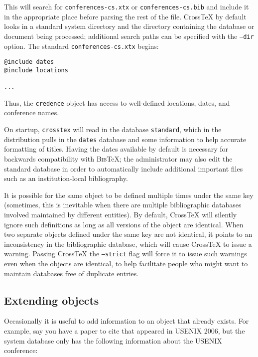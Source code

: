 \documentclass{article}
\newcommand{\XTX}{Cross\TeX}
\newcommand{\BibTeX}{\textsc{Bib}\TeX}
\begin{document}
This will search for \texttt{conferences-cs.xtx} or \texttt{conferences-cs.bib}
and include it in the appropriate place before parsing the rest of the
file. \XTX{} by default looks in a standard system directory and the
directory containing the database or document being processed; additional
search paths can be specified with the \texttt{--dir} option. The standard
\texttt{conferences-cs.xtx} begins:

\begin{small}\begin{verbatim}
@include dates
@include locations

...
\end{verbatim}\end{small}

Thus, the \texttt{credence} object has access to well-defined locations,
dates, and conference names.

On startup, \texttt{crosstex} will read in the database \texttt{standard},
which in the distribution pulls in the \texttt{dates} database and
some information to help accurate formatting of titles.  Having the
dates available by default is necessary for backwards compatibility
with \BibTeX{}; the administrator may also edit the standard database
in order to automatically include additional important files such as an
institution-local bibliography.

It is possible for the same object to be defined multiple times under
the same key (sometimes, this is inevitable when there are multiple
bibliographic databases involved maintained by different entities). By
default, \XTX{} will silently ignore such definitions as long as all
versions of the object are identical. When two separate objects defined
under the same key are not identical, it points to an inconsistency
in the bibliographic database, which will cause \XTX{} to issue a
warning. Passing \XTX{} the \texttt{--strict} flag will force it to issue
such warnings even when the objects are identical, to help facilitate
people who might want to maintain databases free of duplicate entries.

\subsection{Extending objects}

Occasionally it is useful to add information to an object that already
exists.  For example, say you have a paper to cite that appeared in
USENIX 2006, but the system database only has the following information
about the USENIX conference:
\end{document}
